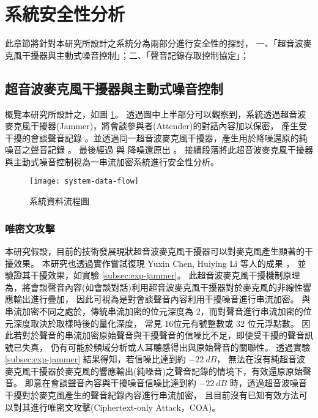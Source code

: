 \section{系統安全性分析}\label{sec:analysis}

    此章節將針對本研究所設計之系統分為兩部分進行安全性的探討，
一、「超音波麥克風干擾器與主動式噪音控制」；二、「聲音記錄存取控制協定」；


\subsection{超音波麥克風干擾器與主動式噪音控制}

    概覽本研究所設計之，如圖 \ref{fig:system-data-flow}。
透過圖中上半部分可以觀察到，系統透過超音波麥克風干擾器(Jammer)，將會談參與者(Attender)的對話內容加以保密，
產生受干擾的會談聲音記錄 \DEFrecJ。並透過同一超音波麥克風干擾器，產生用於降噪還原的純噪音之聲音記錄 \DEFrecN。
最後經過 \DEFfuncEstm{} 與 \DEFfuncAnc{} 降噪還原出 \DEFrecREV。
接續段落將此超音波麥克風干擾器與主動式噪音控制視為一串流加密系統進行安全性分析。

\begin{figure}[H]
    \centering
    \texttt{[image: system-data-flow]}
    \caption{系統資料流程圖}\label{fig:system-data-flow}
\end{figure}


\subsubsection{唯密文攻擊}

    本研究假設，目前的技術發展現狀超音波麥克風干擾器可以對麥克風產生顯著的干擾效果\cite{chen2020demonstrating}。
本研究也透過實作嘗試復現 Yuxin Chen, Huiying Li 等人的成果 \cite{chen2020wearable}，
並驗證其干擾效果，如實驗 \ref{subsec:exp-jammer}。
此超音波麥克風干擾機制原理為，將會談聲音內容(如會談對話)利用超音波麥克風干擾器對於麥克風的非線性響應輸出進行疊加，
因此可視為是對會談聲音內容利用干擾噪音進行串流加密。
與串流加密不同之處於，傳統串流加密的位元深度為 2，而對聲音進行串流加密的位元深度取決於取樣時後的量化深度，
常見 16位元有號整數或 32 位元浮點數。
因此若對於聲音的串流加密原始聲音與干擾聲音的信噪比不足，即便受干擾的聲音訊號已失真，
仍有可能於頻域分析或人耳聽感得出與原始聲音的關聯性。
透過實驗 \ref{subsec:exp-jammer} 結果得知，若信噪比達到約 $-22~dB$，
無法在沒有純超音波麥克風干擾器於麥克風的響應輸出(純噪音)之聲音記錄的情境下，有效還原原始聲音。
即意在會談聲音內容與干擾噪音信噪比達到約 $-22~dB$ 時，透過超音波噪音干擾對於麥克風產生的聲音紀錄內容進行串流加密，
且目前沒有已知有效方法可以對其進行唯密文攻擊(Ciphertext-only Attack，COA)。


